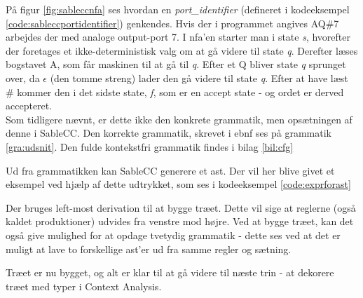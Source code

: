 \noindent På figur \ref{fig:sableccnfa} ses hvordan en \textit{port\_identifier} (defineret i kodeeksempel \ref{code:sableccportidentifier}) genkendes. Hvis der i programmet angives AQ\#7 arbejdes der med analoge output-port 7. I \gls{nfa}'en starter man i state \textit{s}, hvorefter der foretages et ikke-deterministisk valg om at gå videre til state  \textit{q}. Derefter læses bogstavet A, som får maskinen til at gå til \textit{q}. Efter et Q bliver state \textit{q} sprunget over, da $\epsilon$ (den tomme streng) lader den gå videre til state \textit{q}. Efter at have læst \# kommer den i det sidste state, \textit{f}, som er en accept state - og ordet er derved accepteret. \\



\noindent Som tidligere nævnt, er dette ikke den konkrete grammatik, men opsætningen af denne i SableCC. Den korrekte grammatik, skrevet i \gls{ebnf} ses på grammatik \ref{gra:udsnit}. Den fulde kontekstfri grammatik findes i bilag \ref{bil:cfg}



\noindent Ud fra grammatikken kan SableCC generere et \gls{ast}. Der vil her blive givet et eksempel ved hjælp af dette udtrykket, som ses i kodeeksempel \ref{code:exprforast}


\noindent Der bruges left-most derivation til at bygge træet. Dette vil sige at reglerne (også kaldet produktioner) udvides fra venstre mod højre. Ved at bygge træet, kan det også give mulighed for at opdage tvetydig grammatik - dette ses ved at det er muligt at lave to forskellige \gls{ast}'er ud fra samme regler og sætning.


\noindent Træet er nu bygget, og alt er klar til at gå videre til næste trin - at dekorere træet med typer i Context Analysis.